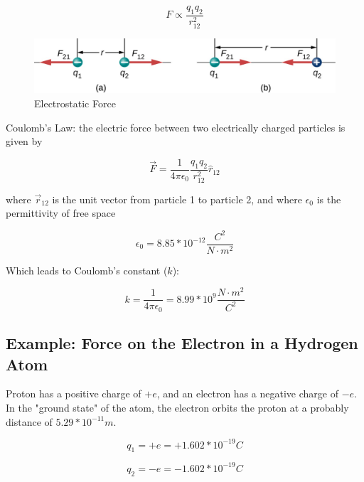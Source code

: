 \documentclass[14pt]{memoir}
\begin{document}
\begin{equation}
F \propto \frac{q_1 q_2}{r^{2}_{12}}
\end{equation}

\begin{figure}[h]
\begin{center}
\includegraphics[scale=0.60]{fig/fig_05_14.jpg}
\caption{Electrostatic Force}
\label{fig:05_14}
\end{center}
\end{figure}

Coulomb's Law: the electric force between two electrically charged particles is given by

\begin{equation}
\vec{F} = \frac{1}{4 \pi \epsilon_0} \frac{q_1 q_2}{r^{2}_{12}} \hat{r}_{12}
\end{equation}

where $\vec{r}_{12}$ is the unit vector from particle 1 to particle 2, and 
where $\epsilon_0$ is the permittivity of free space

\begin{equation}
\epsilon_0 = 8.85 * 10^{-12} \frac{C^2}{N \cdot m^2}
\end{equation}

Which leads to Coulomb's constant ($k$):

\begin{equation}
k = \frac{1}{4 \pi \epsilon_0} = 8.99 * 10^9 \frac{N \cdot m^2}{C^2} 
\end{equation}


\subsection{Example: Force on the Electron in a Hydrogen Atom}

Proton has a positive charge of $+e$, and an electron has a negative charge of $-e$. In the "ground state" of the atom, the electron orbits the proton at a probably distance of $5.29 * 10^{-11} m$.

\begin{equation}
q_1 = +e = +1.602 * 10^{-19} C 
\end{equation}

\begin{equation}
q_2 = -e = -1.602 * 10^{-19} C 
\end{equation}
\end{document}
